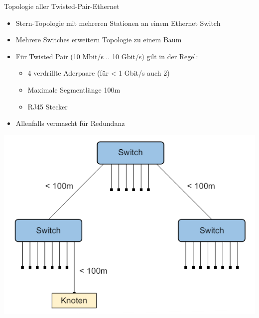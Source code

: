 \begin{definition}{Topologie aller Twisted-Pair-Ethernet}
    \begin{itemize}
        \item Stern-Topologie mit mehreren Stationen an einem Ethernet Switch
        \item Mehrere Switches erweitern Topologie zu einem Baum
        \item Für Twisted Pair (10 Mbit/s .. 10 Gbit/s) gilt in der Regel:
        \begin{itemize}
            \item 4 verdrillte Aderpaare (für < 1 Gbit/s auch 2)
            \item Maximale Segmentlänge 100m
            \item RJ45 Stecker
        \end{itemize}
        \item Allenfalls vermascht für Redundanz
    \end{itemize}
        \includegraphics[width=0.6\linewidth]{images/topologie_twistedpair_ethernet.png} 
\end{definition}

